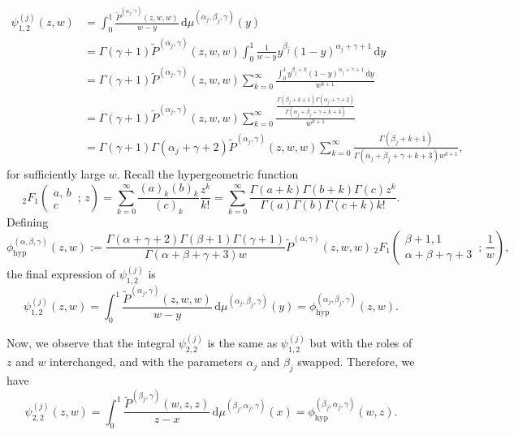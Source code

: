 \documentclass[11pt,reqno]{amsart}
\newcommand{\dr}{\mathrm{d}}
\theoremstyle{definition}
\begin{document}
\begin{equation*}
\begin{split}
\psi_{1,2}^{(j)}(z,w)&=\int_0^1 \frac{\tilde P^{(\alpha_j,\gamma)}(z,w,w) }{w-y}\, \dr \mu^{(\alpha_j,\beta_j,\gamma)}(y)\\ & = \Gamma(\gamma+1) \tilde P^{(\alpha_j,\gamma)}(z,w,w) \int_0^1 \frac{1 }{w-y} y^{\beta_j}(1-y)^{\alpha_j+\gamma+1} \, \dr y\\
&= \Gamma(\gamma+1) \tilde P^{(\alpha_j,\gamma)}(z,w,w) \sum_{k=0}^{\infty} \frac{\int_0^1 y^{\beta_j+k}(1-y)^{\alpha_j+\gamma+1} \, \dr y}{w^{k+1}}\\ &=\Gamma(\gamma+1) \tilde P^{(\alpha_j,\gamma)}(z,w,w) \sum_{k=0}^{\infty} 
\frac{\frac{ \Gamma(\beta_j+k+1)\Gamma(\alpha_j+\gamma+2) }{\Gamma(\alpha_j+\beta_j+\gamma+k+3)}}{w^{k+1}}\\
&= \Gamma(\gamma+1)\Gamma(\alpha_j+\gamma+2) \tilde P^{(\alpha_j,\gamma)}(z,w,w)\sum_{k=0}^{\infty}\frac{\Gamma(\beta_j+k+1)}{\Gamma(\alpha_j+\beta_j+\gamma+k+3)w^{k+1}},
\end{split}
\end{equation*}
for sufficiently large $w$. Recall the hypergeometric function
$$
{_2}F_1\left( \begin{matrix} a,\, b \\ c \end{matrix} \,;\, z \right) = \sum_{k=0}^{\infty}\dfrac{(a)_k (b)_k}{(c)_k}\dfrac{z^k}{k!} = \sum_{k=0}^{\infty}\dfrac{\Gamma(a+k)\Gamma(b+k)\Gamma(c)z^k}{\Gamma(a)\Gamma(b)\Gamma(c+k)k!}.
$$
Defining
\begin{equation}
    \label{eq:phi_hyp}
    \phi^{(\alpha,\beta,\gamma)}_{\mathrm{hyp}}(z,w):= \dfrac{\Gamma(\alpha+\gamma+2)\Gamma(\beta+1)\Gamma(\gamma+1)}{\Gamma(\alpha+\beta+\gamma+3) w} \tilde P^{(\alpha,\gamma)}(z,w,w)\, {_2}F_1\left( \begin{matrix} \beta+1,1 \\ \alpha+\beta+\gamma+3 \end{matrix} \,;\, \dfrac 1 w \right),
\end{equation}
the final expression of $\psi_{1,2}^{(j)}$ is
\begin{equation}
\label{eq:psi_12}
    \psi_{1,2}^{(j)}(z,w) = \int_0^1 \frac{\tilde P^{(\alpha_j,\gamma)}(z,w,w) }{w-y}\, \dr \mu^{(\alpha_j,\beta_j,\gamma)}(y)  = \phi^{(\alpha_j,\beta_j,\gamma)}_{\mathrm{hyp}}(z,w).
\end{equation}


Now, we observe that the integral $\psi_{2,2}^{(j)}$ is the same as $\psi_{1,2}^{(j)}$ but with the roles of $z$ and $w$ interchanged, and with the parameters $\alpha_j$ and $\beta_j$ swapped. Therefore, we have
\begin{equation}
\label{eq:psi_22}
\psi_{2,2}^{(j)}(z,w) = \int_0^1 \frac{\tilde P^{(\beta_j,\gamma)}(w,z,z) }{z-x}\, \dr \mu^{(\beta_j,\alpha_j,\gamma)}(x)  = \phi^{(\beta_j,\alpha_j,\gamma)}_{\mathrm{hyp}}(w,z).
\end{equation}
\end{document}
